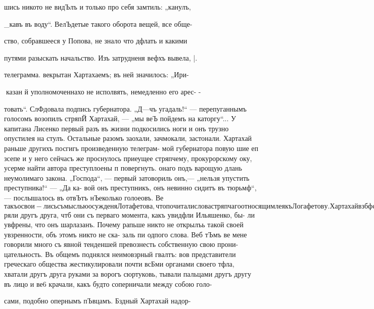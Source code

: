 шись никото не видЪлъ и только про себя замтиль: „канулъ,

_кавъ въ воду“. ВелЪдетые такого оборота вещей, все обще-

ство, собравшееся у Попова, не знало что дфлать и какими

путями разыскать начальство. Изъ затрудненя вефхъ вывела,
|.

телеграмма. векрытан Хартахаемъ; въ ней значилось: „Ири-

казан й уполномоченнахо не исполвять, немедленно его арес- -

товать“. СлФдовала подпись губернатора. „Д—чъ угадаль!“ —
перепуганнымъ голосомъ возопилъ стряпЙ Хартахай, — „мы
веЪ пойдемъ на каторгу“... У капитана Лисенко первый
разъ въ жизни подкосились ноги и онъ трузно опустилея
на стулъ. Остальные разомъ заохали, зачмокали, застонали.
Хартахай раньше другихъ посгигь произведенную телеграм-
мой губернатора повую шие еп зсепе и у него сейчасъ
же проснулось приеущее стряпчему, прокурорскому оку,
усерме найти автора преступлоены п повергнуть. онаго подъ
варощую длань неумолимаго закона. „Господа“, — первый
затовориль онъ,— „нельзя упустить преступника!“ — „Да ка-
вой онъ преступникъ, онъ невинно сидитъ въ тюрьмф“, —
послышалось въ отвЪтъ нЪеколько голоеовъ. Ве$ такъ освои-
лись съ мыслью осужденя Лотафетова, что почитали слова
стряпчаго относящимлея къ Логафетову. Хартахай взбфсился
оть этой неповоротливости сообразительности и на кончик»
языка виефлъ у него отьфть: „барашы“! Но лица, къ коимъ
должно было приложиться @1е пазваве, уже попали свое
Ча рго Чао, и стали совмфетно и громко говорить что-то
въ свое оправдане, причемъ веЪ усердно ув$ряли другъ друга,
чтб они съ перваго момента, какъ увидфли Ильяшенко, бы-
ли увфрены, что онъ шарлазанъ. Почему рапьше никто не
открылъь такой своей увзренности, объ этомъ никто не ска-
заль пи одпого слова. Веб тЪмъ ве мене говорили много
съ явной тенденшей превознесть собственную свою прони-
цательность. Въ общемъ поднялся неимовзрный гвалтъ: вов
представители греческаго общества жестикулировали почти
всБми органами своего тфла, хватали другъ друга руками
за ворогъ сюртуковь, тывали пальцами другъ другу въ лицо
и ве6 крачали, какъ будто соперничали между собою голо-

сами, подобно опернымъ пЪвцамъ. Бздный Хартахай надор-

